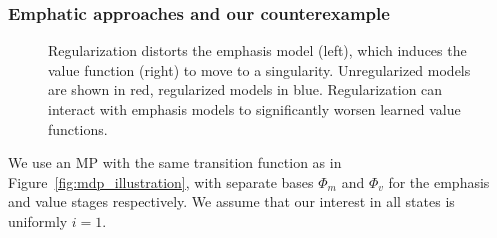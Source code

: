 \subsubsection{Emphatic approaches and our counterexample}
\label{app:emphatic}
\begin{figure}
  
  \caption{Regularization distorts the emphasis model (left), which induces the value function (right) to move to a singularity. Unregularized models are shown in red, regularized models in blue. Regularization can interact with emphasis models to significantly worsen learned value functions. }
  \label{fig:emphasisplots}
\end{figure}

We use an MP with the same transition function as in Figure~\ref{fig:mdp_illustration}, with separate bases $\Phi_m$ and $\Phi_v$ for the emphasis and value stages respectively. We assume that our interest in all states is uniformly $i=1$.

